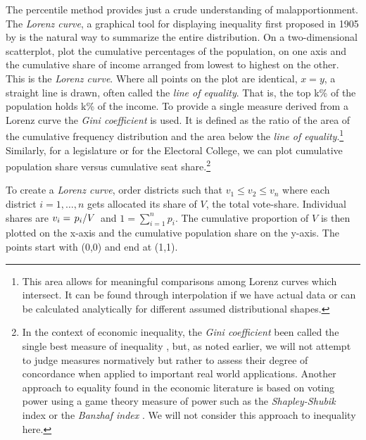 The percentile method provides just a crude understanding of malapportionment. The \textit{Lorenz curve}, a graphical tool for displaying inequality first proposed in 1905 by \citet{Lorenz1905} is the natural way to summarize the entire distribution. On a two-dimensional scatterplot, plot the cumulative percentages of the population, on one axis and the cumulative share of income arranged from lowest to highest on the other. This is the \textit{Lorenz curve}. Where all points on the plot are identical, $x=y$, a straight line is drawn, often called the \textit{line of equality}. That is, the top k\% of the population holds k\% of the income. To provide a single measure derived from a Lorenz curve the \textit{Gini coefficient} is used. It is defined as the ratio of the area of the cumulative frequency distribution and the area below the \textit{line of equality}.\footnote{This area allows for meaningful comparisons among Lorenz curves which intersect. It can be found through interpolation if we have actual data or can be calculated analytically for different assumed distributional shapes.} Similarly, for a legislature or for the Electoral College, we can plot cumulative {population} share versus cumulative seat share.\footnote{In the context of economic inequality, the \textit{Gini coefficient} been called the single best measure of inequality \citep{Morgan1962}, but, as noted earlier, we will not attempt to judge measures normatively but rather to assess their degree of concordance when applied to important real world applications. Another approach to equality found in the economic literature is based on voting power using a game theory measure of power such as the \textit{Shapley-Shubik} index or the \textit{Banzhaf index} \citep{Banzhaf1965, Shapley1954}. We will not consider this approach to inequality here.}

To create a \textit{Lorenz curve}, order districts such that $v_1 \leq v_2 \leq v_n$ where each district $i=1,\dots,n$ gets allocated its share of $V$, the total vote-share. Individual shares are $v_i =\left.p_i\middle/V\right.$ and $1 =\sum_{i=1}^{n}p_i$. The cumulative proportion of $V$ is then plotted on the x-axis and the cumulative population share on the y-axis. The points start with (0,0) and end at (1,1).
 

